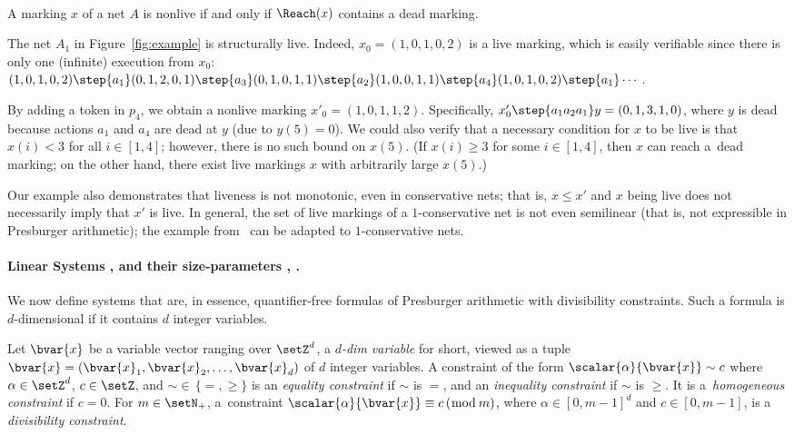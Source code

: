 \begin{prop}\label{prop:nonlivereachdead}
\hfill\\
	A marking $x$ of a net $A$ is nonlive if and only if 
	$\Reach(x)$ contains a dead marking.
\end{prop}



\begin{exa}\label{exa:basiclive}
The net $A_1$ in Figure~\ref{fig:example} 
is structurally live. Indeed, $x_0=(1,0,1,0,2)$ is a
    live marking, which is easily verifiable since there is only one (infinite)
    execution from $x_0$: $(1,0,1,0,2) \step{a_1} (0,1,2,0,1) \step{a_3}
    (0,1,0,1,1) \step{a_2} (1,0,0,1,1) \step{a_4}
    (1,0,1,0,2)\step{a_1}\cdots$.

   By adding a token in $p_4$, we obtain a nonlive marking
	$x'_0=(1,0,1,1,2)$. Specifically,
	$x'_0\step{a_1a_2a_1}y=(0,1,3,1,0)$,
where $y$ is dead because actions $a_1$ and $a_4$ are dead at $y$
	(due to
	$y(5)=0$).
We could also verify that a necessary condition for $x$ to be live is
that 
$x(i)< 3$ for all $i\in[1,4]$; however, there is no such bound on $x(5)$.
(If $x(i)\geq 3$ for some $i\in[1,4]$, then $x$ can reach a~dead
	marking; on the other hand, there exist live markings $x$ with arbitrarily
	large $x(5)$.)
\end{exa}

\begin{rem}
Our example also demonstrates that liveness is not monotonic, even
in conservative nets; that is, $x\leq x'$ and $x$ being live does not
	necessarily imply that $x'$
is live. In general, the set of live markings of
	a $1$-conservative net is not even semilinear (that is, not expressible
	in Presburger arithmetic); the example
	from~\cite{DBLP:journals/acta/JancarP19} can be adapted to
	$1$-conservative nets.
\end{rem}	


\paragraph{Linear Systems , and their size-parameters
,
.} 
We now define systems that are, in essence, 
quantifier-free formulas of Presburger arithmetic with divisibility 
constraints. Such a formula is $d$-dimensional if it contains $d$ 
integer variables.

Let $\bvar{x}$ be a variable vector ranging over $\setZ^d$, a \emph{$d$-dim
variable} for short, viewed as a tuple
$\bvar{x}=(\bvar{x}_1,\bvar{x}_2,\dots,\bvar{x}_d)$ of $d$ integer
variables.
A constraint of
the form $\scalar{\alpha}{\bvar{x}}\sim c$ where $\alpha\in \setZ^d$,
$c\in\setZ$, and $\sim\mathop{\in}\,\{=,\geq\}$ is an \emph{equality
constraint} if $\sim$ is $=$, and an \emph{inequality constraint} if
$\sim$ is $\geq$. It is a~\emph{homogeneous constraint} if $c=0$.
For $m\in\setN_+$, a~constraint 
$\scalar{\alpha}{\bvar{x}}\equiv c\,(\bmod\, m)$, where
$\alpha\in[0,m{-}1]^d$ and $c\in [0,m{-}1]$, is a \emph{divisibility constraint}.

